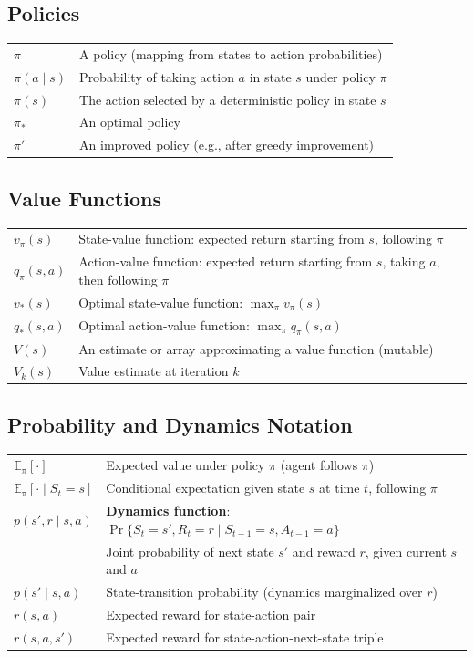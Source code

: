 \documentclass[10pt]{article}
\begin{document}
\subsection{Policies}

\begin{tabular}{@{}l l@{}}
$\pi$ & A policy (mapping from states to action probabilities) \\
$\pi(a \mid s)$ & Probability of taking action $a$ in state $s$ under policy $\pi$ \\
$\pi(s)$ & The action selected by a deterministic policy in state $s$ \\
$\pi_*$ & An optimal policy \\
$\pi'$ & An improved policy (e.g., after greedy improvement) \\
\end{tabular}

\subsection{Value Functions}

\begin{tabular}{@{}l l@{}}
$v_\pi(s)$ & State-value function: expected return starting from $s$, following $\pi$ \\
$q_\pi(s, a)$ & Action-value function: expected return starting from $s$, taking $a$, then following $\pi$ \\
$v_*(s)$ & Optimal state-value function: $\max_\pi v_\pi(s)$ \\
$q_*(s, a)$ & Optimal action-value function: $\max_\pi q_\pi(s, a)$ \\
$V(s)$ & An estimate or array approximating a value function (mutable) \\
$V_k(s)$ & Value estimate at iteration $k$ \\
\end{tabular}

\subsection{Probability and Dynamics Notation}

\begin{tabular}{@{}l l@{}}
$\mathbb{E}_\pi[\cdot]$ & Expected value under policy $\pi$ (agent follows $\pi$) \\
$\mathbb{E}_\pi[\cdot \mid S_t = s]$ & Conditional expectation given state $s$ at time $t$, following $\pi$ \\
$p(s', r \mid s, a)$ & \textbf{Dynamics function}: $\Pr\{S_t = s', R_t = r \mid S_{t-1} = s, A_{t-1} = a\}$ \\
& Joint probability of next state $s'$ and reward $r$, given current $s$ and $a$ \\
$p(s' \mid s, a)$ & State-transition probability (dynamics marginalized over $r$) \\
$r(s, a)$ & Expected reward for state-action pair \\
$r(s, a, s')$ & Expected reward for state-action-next-state triple \\
\end{tabular}
\end{document}
